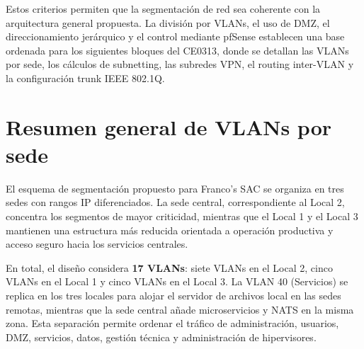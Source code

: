 \documentclass[11pt, a4paper, oneside]{report}
\begin{document}
\normalsize

Estos criterios permiten que la segmentación de red sea coherente con la arquitectura general propuesta. La división por VLANs, el uso de DMZ, el direccionamiento jerárquico y el control mediante pfSense establecen una base ordenada para los siguientes bloques del CE0313, donde se detallan las VLANs por sede, los cálculos de subnetting, las subredes VPN, el routing inter-VLAN y la configuración trunk IEEE 802.1Q.

\section{Resumen general de VLANs por sede}

El esquema de segmentación propuesto para Franco's SAC se organiza en tres sedes con rangos IP diferenciados. La sede central, correspondiente al Local 2, concentra los segmentos de mayor criticidad, mientras que el Local 1 y el Local 3 mantienen una estructura más reducida orientada a operación productiva y acceso seguro hacia los servicios centrales.

En total, el diseño considera \textbf{17 VLANs}: siete VLANs en el Local 2, cinco VLANs en el Local 1 y cinco VLANs en el Local 3. La VLAN 40 (Servicios) se replica en los tres locales para alojar el servidor de archivos local en las sedes remotas, mientras que la sede central añade microservicios y NATS en la misma zona. Esta separación permite ordenar el tráfico de administración, usuarios, DMZ, servicios, datos, gestión técnica y administración de hipervisores.

\renewcommand{\arraystretch}{1.3}
\footnotesize
{}
\end{document}
